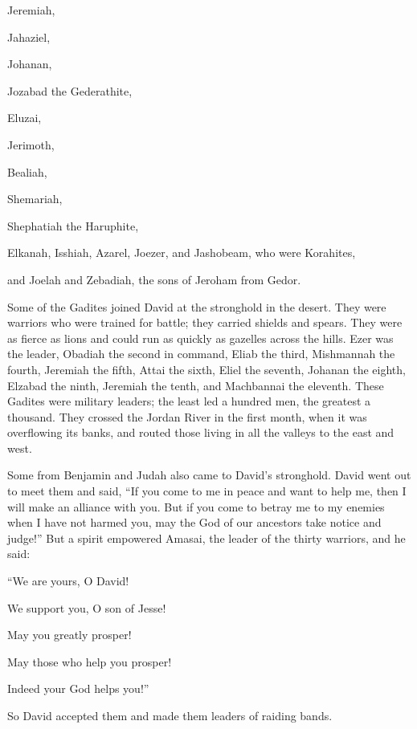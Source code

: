 {\par }{\PP Jeremiah,
\par }{\PP Jahaziel,
\par }{\PP Johanan,
\par }{\PP Jozabad
the
Gederathite,
\par }{\PP {}Eluzai,
\par }{\PP Jerimoth,
\par }{\PP Bealiah,
\par }{\PP Shemariah,
\par }{\PP Shephatiah
the Haruphite,
\par }{\PP {}Elkanah,
Isshiah,
Azarel,
Joezer,
and Jashobeam,
who were Korahites,
\par }{\PP {}and Joelah
and Zebadiah,
the sons
of Jeroham
from Gedor.
\par }{\PP {}Some of the Gadites
joined
David
at the stronghold
in the desert.
They were warriors
who
were trained
for battle;
they carried
shields
and spears.
They were as fierce
as lions
and could run as quickly
as gazelles
across the hills.
Ezer
was the leader,
Obadiah
the second
in command, Eliab
the third,
Mishmannah
the fourth,
Jeremiah
the fifth,
Attai
the sixth,
Eliel
the seventh,
Johanan
the eighth,
Elzabad
the ninth,
Jeremiah
the tenth,
and Machbannai
the eleventh.
These
Gadites
were military leaders;
the least
led a hundred
men, the greatest
a
thousand.
They
crossed
the Jordan River
in the first
month,
when it was overflowing
its banks,
and routed
those living in all
the valleys
to the east
and west.
\par }{\PP {}Some
from Benjamin
and Judah
also came
to David’s
stronghold.
David
went out
to meet
them and said, “If
you come
to me in peace
and want to help
me, then I will make
an alliance
with you. But if
you come to betray
me to my enemies
when I have not
harmed
you, may the God
of our ancestors
take notice
and judge!”
But a spirit
empowered
Amasai,
the leader
of the thirty
warriors, and he said:
\par }{\PP “We are yours, O
David!
\par }{\PP We support
you, O
son
of Jesse!
\par }{\PP May
you greatly prosper!
\par }{\PP May those who help
you prosper!
\par }{\PP Indeed
your God
helps
you!”
\par }{\PP So David
accepted them and made
them leaders
of raiding bands.
}

